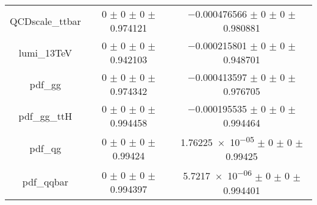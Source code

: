 \begin{table}
\begin{tabular}{ccc}
QCDscale\_ttbar & \num{0} $\pm$ \num{0} $\pm$ \num{0} $\pm$ \num{0.974121} & \num{-0.000476566} $\pm$ \num{0} $\pm$ \num{0} $\pm$ \num{0.980881}\\
lumi\_13TeV & \num{0} $\pm$ \num{0} $\pm$ \num{0} $\pm$ \num{0.942103} & \num{-0.000215801} $\pm$ \num{0} $\pm$ \num{0} $\pm$ \num{0.948701}\\
pdf\_gg & \num{0} $\pm$ \num{0} $\pm$ \num{0} $\pm$ \num{0.974342} & \num{-0.000413597} $\pm$ \num{0} $\pm$ \num{0} $\pm$ \num{0.976705}\\
pdf\_gg\_ttH & \num{0} $\pm$ \num{0} $\pm$ \num{0} $\pm$ \num{0.994458} & \num{-0.000195535} $\pm$ \num{0} $\pm$ \num{0} $\pm$ \num{0.994464}\\
pdf\_qg & \num{0} $\pm$ \num{0} $\pm$ \num{0} $\pm$ \num{0.99424} & \num{1.76225e-05} $\pm$ \num{0} $\pm$ \num{0} $\pm$ \num{0.99425}\\
pdf\_qqbar & \num{0} $\pm$ \num{0} $\pm$ \num{0} $\pm$ \num{0.994397} & \num{5.7217e-06} $\pm$ \num{0} $\pm$ \num{0} $\pm$ \num{0.994401}\\
\bottomrule
\end{tabular}
\end{table}
